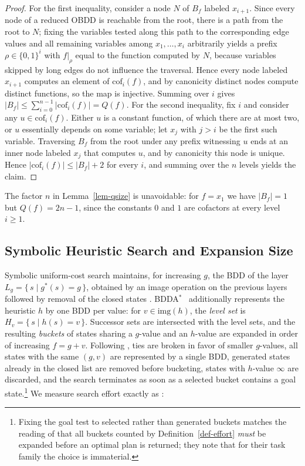 \documentclass[letterpaper]{article}
\newcommand{\gstar}{\ensuremath{g^{*}}}
\newcommand{\bdd}[1]{\ensuremath{B_{#1}}}
\newcommand{\bddsize}[1]{\ensuremath{|B_{#1}|}}
\newcommand{\cofcount}{\ensuremath{Q}}
\newcommand{\level}[2]{\ensuremath{H_{#2}}}
\newcommand{\sub}[2]{\ensuremath{\mathrm{cof}_{#1}(#2)}}
\newcommand{\img}{\ensuremath{\mathrm{img}}}
\newcommand{\bddastar}{BDDA\ensuremath{^{*}}}
\theoremstyle{plain}
\theoremstyle{definition}
\theoremstyle{remark}
\begin{document}
\begin{proof}
For the first inequality, consider a node $N$ of $\bdd{f}$ labeled
$x_{i+1}$. Since every node of a reduced OBDD is reachable from the root,
there is a path from the root to $N$; fixing the variables tested along
this path to the corresponding edge values and all remaining variables
among $x_1, \dots, x_i$ arbitrarily yields a prefix $\rho \in \{0,1\}^i$
with $f|_\rho$ equal to the function computed by $N$, because variables
skipped by long edges do not influence the traversal. Hence every node
labeled $x_{i+1}$ computes an element of $\sub{i}{f}$, and by canonicity
distinct nodes compute distinct functions, so the map is injective.
Summing over $i$ gives
$\bddsize{f} \leq \sum_{i=0}^{n-1} |\sub{i}{f}| = \cofcount(f)$. For the
second inequality, fix $i$ and consider any $u \in \sub{i}{f}$. Either
$u$ is a constant function, of which there are at most two, or $u$
essentially depends on some variable; let $x_j$ with $j > i$ be the first
such variable. Traversing $\bdd{f}$ from the root under any prefix
witnessing $u$ ends at an inner node labeled $x_j$ that computes $u$, and
by canonicity this node is unique. Hence
$|\sub{i}{f}| \leq \bddsize{f} + 2$ for every $i$, and summing over the
$n$ levels yields the claim.
\end{proof}

The factor $n$ in Lemma~\ref{lem-qsize} is unavoidable: for
$f = x_1$ we have $\bddsize{f} = 1$ but $\cofcount(f) = 2n - 1$, since
the constants $0$ and $1$ are cofactors at every level $i \geq 1$.

\subsection{Symbolic Heuristic Search and Expansion Size}

Symbolic uniform-cost search maintains, for increasing $g$, the BDD of
the layer $L_g = \{\, s \mid \gstar(s) = g \,\}$, obtained by an image
operation on the previous layers followed by removal of the closed
states \citep{torralba-et-al-aij2017}. \bddastar\
\citep{edelkamp-reffel-ki1998} additionally represents the heuristic $h$
by one BDD per value: for $v \in \img(h)$, the \emph{level set} is
$\level{h}{v} = \{\, s \mid h(s) = v \,\}$. Successor sets are
intersected with the level sets, and the resulting \emph{buckets} of
states sharing a $g$-value and an $h$-value are expanded in order of
increasing $f = g + v$. Following
\citet{kissmann-edelkamp-aaai2011,torralba-phd2015,speck-et-al-icaps2020},
ties are broken in favor of smaller $g$-values, all states with the same
$(g, v)$ are represented by a single BDD, generated states already in the
closed list are removed before bucketing, states with $h$-value $\infty$
are discarded, and the search terminates as soon as a selected bucket
contains a goal state.\footnote{Fixing the goal test to selected rather
than generated buckets matches the reading of
\citet{speck-et-al-icaps2020} that all buckets counted by
Definition~\ref{def-effort} \emph{must} be expanded before an optimal
plan is returned; they note that for their task family the choice is
immaterial.} We measure search effort exactly as
\citet{speck-et-al-icaps2020}:
\end{document}
